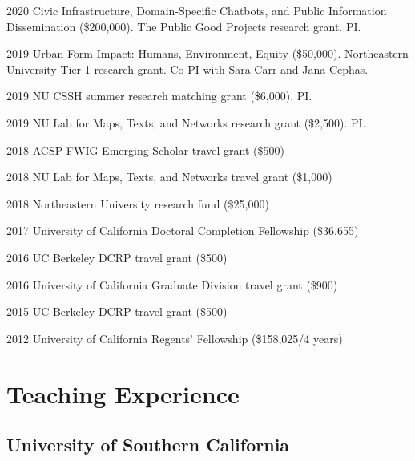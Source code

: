\documentclass[12pt,letterpaper]{report}
\begin{document}
    \begin{tablist}

        \item[2020] \tab Civic Infrastructure, Domain-Specific Chatbots, and Public Information Dissemination (\$200,000). The Public Good Projects research grant. PI.
        
        \item[2019] \tab Urban Form Impact: Humans, Environment, Equity (\$50,000). Northeastern University Tier 1 research grant. Co-PI with Sara Carr and Jana Cephas.

        \item[2019] \tab NU CSSH summer research matching grant (\$6,000). PI.

        \item[2019] \tab NU Lab for Maps, Texts, and Networks research grant (\$2,500). PI.

        \item[2018] \tab ACSP FWIG Emerging Scholar travel grant (\$500)

        \item[2018] \tab NU Lab for Maps, Texts, and Networks travel grant (\$1,000)

        \item[2018] \tab Northeastern University research fund (\$25,000)

        \item[2017] \tab University of California Doctoral Completion Fellowship (\$36,655)

        \item[2016] \tab UC Berkeley DCRP travel grant (\$500)

        \item[2016] \tab University of California Graduate Division travel grant (\$900)

        \item[2015] \tab UC Berkeley DCRP travel grant (\$500)

        \item[2012] \tab University of California Regents' Fellowship (\$158,025/4 years)

    \end{tablist}



    \section*{Teaching Experience}

    \subsection*{University of Southern California}
    
\end{document}
